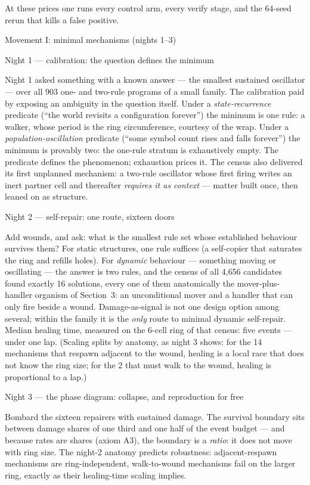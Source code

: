 \noindent At these prices one runs every control arm, every verify
stage, and the 64-seed rerun that kills a false positive.

\sec Movement I: minimal mechanisms (nights 1--3)

\secc Night 1 --- calibration: the question defines the minimum

Night 1 asked something with a known answer --- the smallest
sustained oscillator --- over all 903 one- and two-rule programs of
a small family. The calibration paid by exposing an ambiguity in
the question itself. Under a {\it state-recurrence} predicate
(“the world revisits a configuration forever”) the minimum is one
rule: a walker, whose period is the ring circumference, courtesy of
the wrap. Under a {\it population-oscillation} predicate (“some
symbol count rises and falls forever”) the minimum is provably
two: the one-rule stratum is exhaustively empty. The predicate
defines the phenomenon; exhaustion prices it. The census also
delivered its first unplanned mechanism: a two-rule oscillator
whose first firing writes an inert partner cell and thereafter
{\it requires it as context} --- matter built once, then leaned on
as structure.

\secc Night 2 --- self-repair: one route, sixteen doors

Add wounds, and ask: what is the smallest rule set whose
established behaviour survives them? For static structures, one
rule suffices (a self-copier that saturates the ring and refills
holes). For {\it dynamic} behaviour --- something moving or
oscillating --- the answer is two rules, and the census of all
4{,}656 candidates found exactly 16 solutions, every one of them
anatomically the mover-plus-handler organism of Section~3: an
unconditional mover and a handler that can only fire beside a
wound. Damage-as-signal is not one design option among several;
within the family it is the {\it only} route to minimal dynamic
self-repair. Median healing time, measured on the 6-cell ring of
that census: five events --- under one lap. (Scaling splits by
anatomy, as night 3 shows: for the 14 mechanisms that respawn
adjacent to the wound, healing is a local race that does not know
the ring size; for the 2 that must walk to the wound, healing is
proportional to a lap.)

\secc Night 3 --- the phase diagram: collapse, and reproduction for free

Bombard the sixteen repairers with sustained damage. The survival
boundary sits between damage shares of one third and one half of
the event budget --- and because rates are shares (axiom A3), the
boundary is a {\it ratio}: it does not move with ring size. The
night-2 anatomy predicts robustness: adjacent-respawn mechanisms
are ring-independent, walk-to-wound mechanisms fail on the larger
ring, exactly as their healing-time scaling implies.

